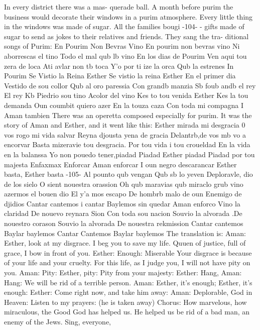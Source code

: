 {{In every district there was a mas-
querade ball.
A month before purim the business would decorate their windows in a purim 
atmosphere.
Every little thing in the windows was made of sugar.
All the families bougi
-104- 
- gifts made of sugar to send as jokes to their relatives and friends.
They sang the tra-
ditional songs of Purim: 
En Pourim Non Bevras Vino 
En pourim non bevras vino 
Ni aborrescas el tino 
Todo el mal qub lb vino 
En los dias de Pourim 
Ven aqui tou zera de loca 
Ati avlar non tb toca 
Y'o por ti ize la orca 
Qub la estrenes 
In Pourim 
Se Vistio la Reina Esther 
Se vistio la reina Esther 
En el primer dia 
Vestido de sou collor 
Qub al oro paressia 
Con grandb manzia 
Sb foub andb el rey 
El rey Kb %
Piedrio sou tino 
Acolor del vino 
Kes to tou venida Esther 
Kes la tou demanda 
Oun coumbit quiero azer 
En la touza caza 
Con toda mi compagna 
I Aman tambien 
There was an operetta composed especially for purim.
It was the story of Aman and 
Esther, and it went like this: 
Esther mirada mi desgracia 
0 vos rogo mi vida salvar 
Reyna djousta yena de gracia 
Delantrb,de vos mb vo a encorvar 
Basta mizeravie tou desgracia.
Por tou vida i tou croueldad 
En la vida en la balanssa 
Yo non pouedo tener,piadad 
Piadad Esther piadad 
Piadad por tou majesta 
Enfaxmax 
Enforcar Aman enforcar 
I oun negro descarancar 
Esther basta, Esther basta 
-105- 
Al pounto qub vengan 
Qub sb lo yeven 
Deploravle, dio de los sielo 
O sient nouestra orassion 
Oh qub maravias qub miraclo 
grub vino azermos el bouen dio 
El y'a mos escapo 
De hombrb malo de oun 
Enemigo de djidios 
Cantar cantemos i cantar 
Baylemos sin quedar 
Aman enforco 
Vino la claridad 
De nouevo reynara Sion 
Con toda sou nacion 
Souvio la alvorada 
.De nouestro corason 
Souvio la alvorada 
De nouestra rekmission 
Cantar cantemos 
Baylar baylemos 
Cantar Cantemos 
Baylar baylemos 
The translation is: 
Aman: Esther, look at my disgrace.
I beg you to save my life.
Quuen 
of justice, full of grace, I bow in front of you.
Esther: Enough: Miserable Your disgrace is because of your life and 
your cruelty.
For this life, as I judge you, I will not have 
pity on you.
Aman: Pity: Esther, pity: Pity from your majesty: 
Esther: Hang, Aman: Hang: We will be rid of a terrible person.
Aman: Esther, it's enough; Esther, it's enough: 
Esther: Come right now, and take him away: 
Aman: Deplorable, God in Heaven: Listen to my prayers: 
(he is taken away) 
Chorus: How marvelous, how miraculous, the Good God has helped us.
He 
helped us be rid of a bad man, an enemy of the Jews.
Sing, everyone, 
}}
